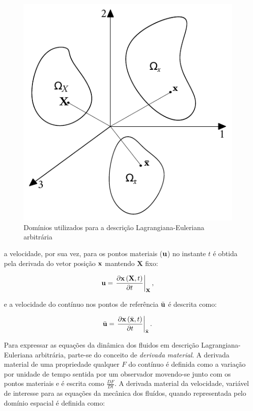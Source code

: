 \documentclass[tese_patricia]{subfiles}%
\begin{document}
\begin{figure}[htb!]
	\centering
	\includegraphics[scale=1.0]{Imagens/Cap1/ALE.pdf}	
	\caption{Domínios utilizados para a descrição Lagrangiana-Euleriana arbitrária}
	\label{fig:Ale}
\end{figure}

\noindent a velocidade, por sua vez, para os pontos materiais ($\mathbf{u}$) no instante $t$ é obtida pela derivada do vetor posição $\mathbf{x}$ mantendo $\mathbf{X}$ fixo:

\begin{align}
\mathbf{u} = \left. \frac{\partial\mathbf{x}\left(\mathbf{X},t\right)}{\partial t} \right|_\mathbf{X}, \label{eq:vel}
\end{align}

\noindent e a velocidade do contínuo nos pontos de referência $\bar{\mathbf{u}}$ é descrita como:

\begin{align}
\bar{\mathbf{u}} = \left. \frac{\partial\mathbf{x}\left({\bar{\mathbf{x}}},t\right)}{\partial t} \right| _{\bar{\mathbf{x}}}. \label{eq:velALE}
\end{align}

Para expressar as equações da dinâmica dos fluidos em descrição Lagrangiana-Euleriana arbitrária, parte-se do conceito de \textit{derivada material}. A derivada material de uma propriedade qualquer $F$ do contínuo é definida como a variação por unidade de tempo sentida por um observador movendo-se junto com os pontos materiais e é escrita como $\frac{DF}{Dt}$. A derivada material da velocidade, variável de interesse para as equações da mecânica dos fluídos, quando representada pelo domínio espacial é definida como:
\end{document}

